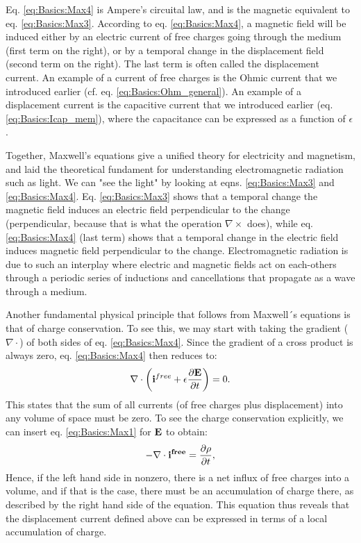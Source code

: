 Eq.  \ref{eq:Basics:Max4} is Ampere's circuital law, and is the magnetic equivalent to eq. \ref{eq:Basics:Max3}. According to eq. \ref{eq:Basics:Max4}, a magnetic field will be induced either by an electric current of free charges going through the medium (first term on the right), or by a temporal change in the displacement field (second term on the right). The last term is often called the displacement current. An example of a current of free charges is the Ohmic current that we introduced earlier (cf. eq. \ref{eq:Basics:Ohm_general}). An example of a displacement current is the capacitive current that we introduced earlier (eq. \ref{eq:Basics:Icap_mem}), where the capacitance can be expressed as a function of $\epsilon$. 

Together, Maxwell's equations give a unified theory for electricity and magnetism, and laid the theoretical fundament for understanding electromagnetic radiation such as light. We can "see the light" by looking at eqns. \ref{eq:Basics:Max3} and \ref{eq:Basics:Max4}. Eq. \ref{eq:Basics:Max3} shows that a temporal change the magnetic field induces an electric field perpendicular to the change (perpendicular, because that is what the operation $\nabla \times$ does), while eq. \ref{eq:Basics:Max4} (last term) shows that a temporal change in the electric field induces magnetic field perpendicular to the change. Electromagnetic radiation is due to such an interplay where electric and magnetic fields act on each-others through a periodic series of inductions and cancellations that propagate as a wave through a medium. 

Another fundamental physical principle that follows from Maxwell´s equations is that of charge conservation. To see this, we may start with taking the gradient ($\nabla \cdot$) of both sides of eq. \ref{eq:Basics:Max4}. Since the gradient of a cross product is always zero, eq. \ref{eq:Basics:Max4} then reduces to:
\begin{equation}
\nabla \cdot \left( {\bf i}^{free} +  \epsilon \frac{\partial {\bf E}}{\partial t} \right) = 0.
\label{eq:Basics:Max4dot}
\end{equation}
This states that the sum of all currents (of free charges plus displacement) into any volume of space must be zero. To see the charge conservation explicitly, we can insert eq. \ref{eq:Basics:Max1} for ${\bf E}$ to obtain:
\begin{equation}
- \nabla \cdot {\bf i^{free}} =  \frac{\partial \rho}{\partial t},
\label{eq:Basics:currentconservation}
\end{equation}
Hence, if the left hand side in nonzero, there is a net influx of free charges into a volume, and if that is the case, there must be an accumulation of charge there, as described by the right hand side of the equation. This equation thus reveals that the displacement current defined above can be expressed in terms of a local accumulation of charge.



